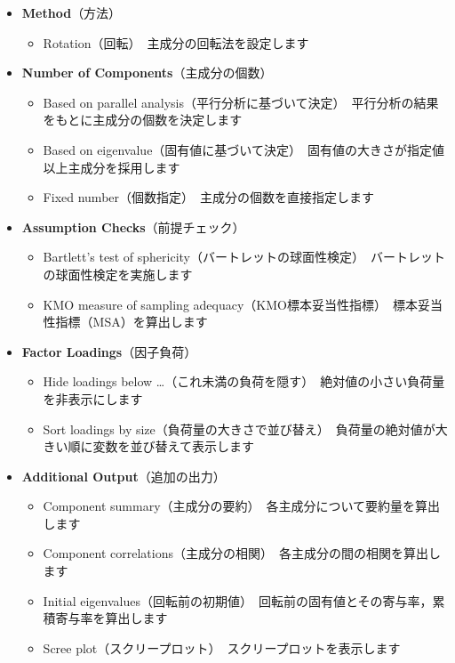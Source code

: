\documentclass[
  12pt,
  a5jpaper,
  lualatex, ja=standard]{bxjsbook}
\providecommand{\tightlist}{%
  \setlength{\itemsep}{0pt}\setlength{\parskip}{0pt}}
\newenvironment{jmvsettings}{%
	\begin{center}%
	\begin{tcolorbox}[%
		title=設定項目,
		colframe=gmoji,
		colbacktitle=gmoji,
		colback=gmoji!2!white,
		breakable,
		width=.9\textwidth,
		]\small\addtolength{\leftmargini}{-3\labelsep}%
	}%
	{\end{tcolorbox}\end{center}}
\begin{document}
\begin{jmvsettings}

\begin{itemize}
\tightlist
\item
  \textbf{Method}（方法）

  \begin{itemize}
  \tightlist
  \item
    Rotation（回転）　主成分の回転法を設定します
  \end{itemize}
\item
  \textbf{Number of Components}（主成分の個数）

  \begin{itemize}
  \tightlist
  \item
    Based on parallel analysis（平行分析に基づいて決定）　平行分析の結果をもとに主成分の個数を決定します
  \item
    Based on eigenvalue（固有値に基づいて決定）　固有値の大きさが指定値以上主成分を採用します
  \item
    Fixed number（個数指定）　主成分の個数を直接指定します
  \end{itemize}
\item
  \textbf{Assumption Checks}（前提チェック）

  \begin{itemize}
  \tightlist
  \item
    Bartlett's test of sphericity（バートレットの球面性検定）　バートレットの球面性検定を実施します
  \item
    KMO measure of sampling adequacy（KMO標本妥当性指標）　標本妥当性指標（MSA）を算出します
  \end{itemize}
\item
  \textbf{Factor Loadings}（因子負荷）

  \begin{itemize}
  \tightlist
  \item
    Hide loadings below \ldots（これ未満の負荷を隠す）　絶対値の小さい負荷量を非表示にします
  \item
    Sort loadings by size（負荷量の大きさで並び替え）　負荷量の絶対値が大きい順に変数を並び替えて表示します
  \end{itemize}
\item
  \textbf{Additional Output}（追加の出力）

  \begin{itemize}
  \tightlist
  \item
    Component summary（主成分の要約）　各主成分について要約量を算出します
  \item
    Component correlations（主成分の相関）　各主成分の間の相関を算出します
  \item
    Initial eigenvalues（回転前の初期値）　回転前の固有値とその寄与率，累積寄与率を算出します
  \item
    Scree plot（スクリープロット）　スクリープロットを表示します
  \end{itemize}
\end{itemize}

\end{jmvsettings}
\end{document}

